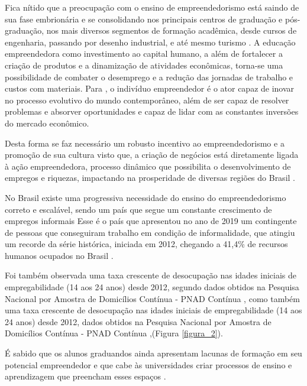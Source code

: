 Fica nítido que a preocupação com o ensino de empreendedorismo está saindo de sua fase embrionária e se consolidando nos principais centros de graduação e pós-graduação, nos mais diversos segmentos de formação acadêmica, desde cursos de engenharia, passando por desenho industrial, e até mesmo turismo \cite{henrique_praticas_2008}. A educação empreendedora como investimento ao capital humano, a além de fortalecer a criação de produtos e a dinamização de atividades econômicas, torna-se uma possibilidade de combater o desemprego \cite{morais_empreendedorismo_2018} e a redução das jornadas de trabalho e custos com materiais. Para , o indivíduo empreendedor é o ator capaz de inovar no processo evolutivo do mundo contemporâneo, além de ser capaz de resolver problemas e absorver oportunidades e capaz de lidar com as constantes inversões do mercado econômico. 

Desta forma se faz necessário um robusto incentivo ao empreendedorismo e a promoção de sua cultura visto que, a criação de negócios está diretamente ligada à ação empreendedora, processo dinâmico que possibilita o desenvolvimento de empregos e riquezas, impactando na prosperidade de diversas regiões do Brasil \cite{leite_aprendizagem_2015}.

No Brasil existe uma progressiva necessidade do ensino do empreendedorismo correto e escalável, sendo um país que segue um constante crescimento de empregos informais Esse é o país que apresentou no ano de 2019 um contingente de pessoas que conseguiram trabalho em condição de informalidade, que atingiu um recorde da série histórica, iniciada em 2012, chegando a 41,4\% de recursos humanos ocupados no Brasil \cite{ibge_informalidade_2019}. 

Foi também observada uma taxa crescente de desocupação nas idades iniciais de empregabilidade (14 aos 24 anos) desde 2012, segundo dados obtidos na Pesquisa Nacional por Amostra de Domicílios Contínua - PNAD Contínua  \cite{ibge_informalidade_2019}, como também uma taxa crescente de desocupação nas idades iniciais de empregabilidade (14 aos 24 anos) desde 2012, dados obtidos na Pesquisa Nacional por Amostra de Domicílios Contínua - PNAD Contínua \cite{ibge_instituto_brasileiro_de_geografia_e_estatistica_pesquisa_2019},(Figura \ref{figura_2}). 

É sabido que os alunos graduandos ainda apresentam lacunas de formação em seu potencial empreendedor e que cabe às universidades criar processos de ensino e aprendizagem que preencham esses espaços  \cite{pietrovski_alise_2019}.


